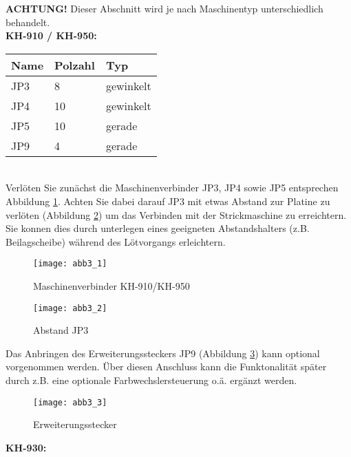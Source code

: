 \documentclass[fleqn,10pt]{SelfArx} %
\begin{document}
\textbf{ACHTUNG!} Dieser Abschnitt wird je nach Maschinentyp unterschiedlich behandelt.\\

\textbf{KH-910 / KH-950:} \\

\begin{tabular}{lll}
\hline
\textbf{Name} & \textbf{Polzahl}  & \textbf{Typ} \\ \hline
JP3           & 8                 & gewinkelt    \\ \hline
JP4           & 10                & gewinkelt    \\ \hline
JP5           & 10                & gerade       \\ \hline
JP9           & 4                 & gerade       \\ \hline
\end{tabular}\\

Verlöten Sie zunächst die Maschinenverbinder JP3, JP4 sowie JP5 entsprechen Abbildung \ref{fig:abb3_1}. Achten Sie dabei darauf JP3 mit etwas Abstand zur Platine zu verlöten (Abbildung \ref{fig:abb3_2}) um das Verbinden mit der Strickmaschine zu erreichtern. Sie konnen dies durch unterlegen eines geeigneten Abstandshalters (z.B. Beilagscheibe) während des Lötvorgangs erleichtern.

\begin{figure}[tbhp]\centering
\texttt{[image: abb3\_1]}
\caption{Maschinenverbinder KH-910/KH-950}
\label{fig:abb3_1}
\end{figure}

\begin{figure}[tbhp]\centering
\texttt{[image: abb3\_2]}
\caption{Abstand JP3}
\label{fig:abb3_2}
\end{figure}

Das Anbringen des Erweiterungssteckers JP9 (Abbildung \ref{fig:abb3_3}) kann optional vorgenommen werden. Über diesen Anschluss kann die Funktonalität später durch z.B. eine optionale Farbwechslersteuerung o.ä. ergänzt werden. \par

\begin{figure}[tbhp]\centering
\texttt{[image: abb3\_3]}
\caption{Erweiterungsstecker}
\label{fig:abb3_3}
\end{figure}

\FloatBarrier

\textbf{KH-930:} \\
\end{document}
